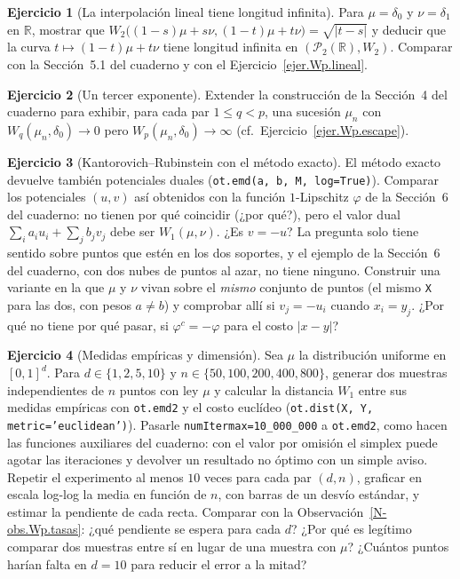 \documentclass[11pt,a4paper]{amsart}
\newcounter{chapter}
\newcommand{\R}{{\mathbb R}}
\theoremstyle{remark}
\theoremstyle{definition}
\newtheorem{ejercicio}{Ejercicio}[chapter]
\numberwithin{subsection}{section}
\numberwithin{equation}{section}
\begin{document}
\begin{ejercicio}[La interpolación lineal tiene longitud infinita]\label{ejc.Wp.lineal}
Para $\mu=\delta_0$ y $\nu=\delta_1$ en $\R$, mostrar que
$W_2\bigl((1-s)\mu+s\nu,(1-t)\mu+t\nu\bigr)=\sqrt{|t-s|}$ y deducir que la
curva $t\mapsto(1-t)\mu+t\nu$ tiene longitud infinita en $(\mathcal P_2(\R),W_2)$.
Comparar con la Sección~5.1 del cuaderno y con el
Ejercicio~\ref{ejer.Wp.lineal}.
\end{ejercicio}

\begin{ejercicio}[Un tercer exponente]\label{ejc.Wp.exponente}
Extender la construcción de la Sección~4 del cuaderno para exhibir, para cada
par $1\le q<p$, una sucesión $\mu_n$ con $W_q(\mu_n,\delta_0)\to0$ pero
$W_p(\mu_n,\delta_0)\to\infty$ (cf.\ Ejercicio~\ref{ejer.Wp.escape}).
\end{ejercicio}

\begin{ejercicio}[Kantorovich--Rubinstein con el método exacto]\label{ejc.Wp.KR}
El método exacto devuelve también potenciales duales
(\texttt{ot.emd(a, b, M, log=True)}). Comparar los potenciales $(u,v)$ así
obtenidos con la función $1$-Lipschitz $\varphi$ de la Sección~6 del cuaderno:
no tienen por qué coincidir (¿por qué?), pero el valor dual
$\sum_ia_iu_i+\sum_jb_jv_j$ debe ser $W_1(\mu,\nu)$. ¿Es $v=-u$? La pregunta
solo tiene sentido sobre puntos que estén en los dos soportes, y el ejemplo
de la Sección~6 del cuaderno, con dos nubes de puntos al azar, no tiene
ninguno. Construir una variante en la que $\mu$ y $\nu$ vivan sobre el
\emph{mismo} conjunto de puntos (el mismo \texttt{X} para las dos, con pesos
$a\neq b$) y comprobar allí si $v_j=-u_i$ cuando $x_i=y_j$. ¿Por qué no tiene
por qué pasar, si $\varphi^c=-\varphi$ para el costo $|x-y|$?
\end{ejercicio}

\begin{ejercicio}[Medidas empíricas y dimensión]\label{ejc.Wp.muestras}
Sea $\mu$ la distribución uniforme en $[0,1]^d$. Para $d\in\{1,2,5,10\}$ y
$n\in\{50,100,200,400,800\}$, generar dos muestras independientes de $n$
puntos con ley $\mu$ y calcular la distancia $W_1$ entre sus medidas
empíricas con \texttt{ot.emd2} y el costo euclídeo
(\texttt{ot.dist(X, Y, metric='euclidean')}). Pasarle
\texttt{numItermax=10\_000\_000} a \texttt{ot.emd2}, como hacen las funciones
auxiliares del cuaderno: con el valor por omisión el simplex puede agotar las
iteraciones y devolver un resultado no óptimo con un simple aviso. Repetir el experimento al
menos $10$ veces para cada par $(d,n)$, graficar en escala log-log la media
en función de $n$, con barras de un desvío estándar, y estimar la pendiente
de cada recta. Comparar con la Observación~\ref{N-obs.Wp.tasas}: ¿qué
pendiente se espera para cada $d$? ¿Por qué es legítimo comparar dos
muestras entre sí en lugar de una muestra con $\mu$? ¿Cuántos puntos harían
falta en $d=10$ para reducir el error a la mitad?
\end{ejercicio}



\end{document}
